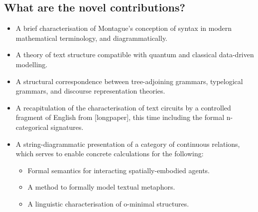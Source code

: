 \subsection{What are the novel contributions?}
\begin{itemize}
\item{A brief characterisation of Montague's conception of syntax in modern mathematical terminology, and diagrammatically.}
\item{A theory of text structure compatible with quantum and classical data-driven modelling.}
\item{A structural correspondence between tree-adjoining grammars, typelogical grammars, and discourse representation theories.}
\item{A recapitulation of the characterisation of text circuits by a controlled fragment of English from [longpaper], this time including the formal n-categorical signatures.}
\item{A string-diagrammatic presentation of a category of continuous relations, which serves to enable concrete calculations for the following:
\begin{itemize}
\item{Formal semantics for interacting spatially-embodied agents.}
\item{A method to formally model textual metaphors.}
\item{A linguistic characterisation of o-minimal structures.}
\end{itemize}
}
\end{itemize}